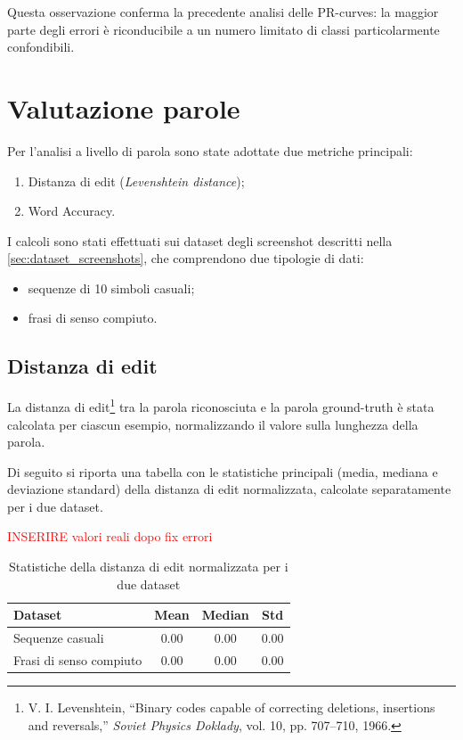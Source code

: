 Questa osservazione conferma la precedente analisi delle PR-curves: la maggior parte degli errori è riconducibile a un numero limitato di classi particolarmente confondibili.

\section{Valutazione parole}
\label{sec:valutazione-parole}

Per l'analisi a livello di parola sono state adottate due metriche principali:
\begin{enumerate}
    \item Distanza di edit (\emph{Levenshtein distance});
    \item Word Accuracy.
\end{enumerate}

I calcoli sono stati effettuati sui dataset degli screenshot descritti nella \autoref{sec:dataset_screenshots}, che comprendono due tipologie di dati:
\begin{itemize}
    \item sequenze di 10 simboli casuali;
    \item frasi di senso compiuto.
\end{itemize}

\subsection{Distanza di edit}

La distanza di edit\footnote{V. I. Levenshtein, “Binary codes capable of correcting deletions, insertions and reversals,” \textit{Soviet Physics Doklady}, vol. 10, pp. 707–710, 1966.} tra la parola riconosciuta e la parola ground-truth è stata calcolata per ciascun esempio, normalizzando il valore sulla lunghezza della parola.

Di seguito si riporta una tabella con le statistiche principali (media, mediana e deviazione standard) della distanza di edit normalizzata, calcolate separatamente per i due dataset.

\textcolor{red}{INSERIRE valori reali dopo fix errori}

\begin{table}[htbp]
    \centering
    \begin{tabular}{lccc}
        \toprule
        Dataset & Mean & Median & Std \\
        \midrule
        Sequenze casuali & 0.00 & 0.00 & 0.00 \\
        Frasi di senso compiuto & 0.00 & 0.00 & 0.00 \\
        \bottomrule
    \end{tabular}
    \caption{Statistiche della distanza di edit normalizzata per i due dataset}
    \label{tab:edit_distance_stats}
\end{table}

